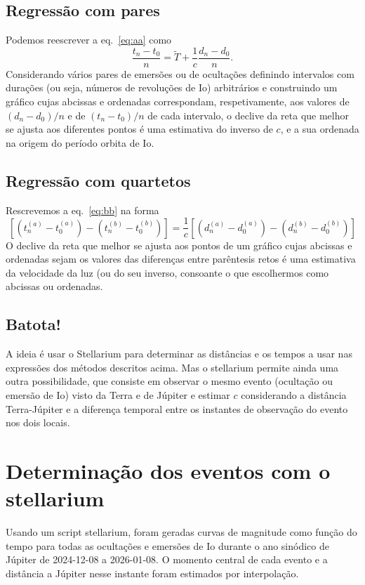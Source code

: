 \documentclass[]{article}
\begin{document}
\subsection{Regressão com pares}
Podemos reescrever a eq.~\eqref{eq:aa} como
\begin{equation}
  \frac{t_n-t_0}{n}=\tilde T+\frac{1}{c}\frac{d_n-d_0}{n}.
\end{equation}
Considerando vários pares de emersões ou de ocultações definindo intervalos com
durações (ou seja, números de revoluções de Io) arbitrários e construindo um
gráfico cujas abcissas e ordenadas correspondam, respetivamente, aos valores de
$(d_n-d_0)/n$ e de $(t_n-t_0)/n$ de cada intervalo, o declive da reta que
melhor se ajusta aos diferentes pontos é uma estimativa do inverso de $c$, e a
sua ordenada na origem do período orbita de Io.

\subsection{Regressão com quartetos}
Rescrevemos a eq.~\eqref{eq:bb} na forma
\begin{equation}
  \left[
    {\left(t^{(a)}_n-t^{(a)}_0\right)-\left(t^{(b)}_n-t^{(b)}_0\right)}
  \right]=
  \frac{1}{c}
  \left[
    {\left(d^{(a)}_n-d^{(a)}_0\right)-\left(d^{(b)}_n-d^{(b)}_0\right)}
  \right]
\end{equation}
O declive da reta que melhor se ajusta aos pontos de um gráfico cujas abcissas e
ordenadas sejam os valores das diferenças entre parêntesis retos é uma
estimativa da velocidade da luz (ou do seu inverso, consoante o que escolhermos
como abcissas ou ordenadas.

\subsection{Batota!}
A ideia é usar o Stellarium para determinar as distâncias e os tempos a usar nas
expressões dos métodos descritos acima. Mas o stellarium permite ainda uma outra
possibilidade, que consiste em observar o mesmo evento (ocultação ou emersão de
Io) visto da Terra e de Júpiter e estimar $c$ considerando a distância
Terra-Júpiter e a diferença temporal entre os instantes de observação do evento
nos dois locais.

\section{Determinação dos eventos com o stellarium}
Usando um script stellarium, foram geradas curvas de magnitude como função do
tempo para todas as ocultações e emersões de Io durante o ano sinódico de
Júpiter de 2024-12-08 a 2026-01-08. O momento central de cada evento e a
distância a Júpiter nesse instante foram estimados por interpolação. 
\end{document}
